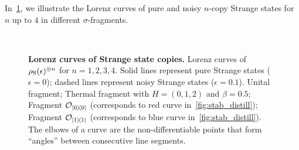 \documentclass[pra,
aps,
twocolumn,
superscriptaddress,
groupedaddress,
nofootinbib,
reprint
]{revtex4-1}
\begin{document}
In~\cref{fig:lcs}, we illustrate the Lorenz curves of pure and noisy $n$-copy Strange states for $n$ up to $4$ in different $\sigma$-fragments.
\begin{figure}%
    \centering
    \hspace{1pt}%
    \\
    \hspace{1pt}%
    \caption{\textbf{Lorenz curves of Strange state copies.} Lorenz curves of $\rho_{\rm{S}}(\epsilon)^{\otimes n}$ for $n=1,2,3,4$.
    Solid lines represent pure Strange states ($\epsilon = 0$); dashed lines represent noisy Strange states ($\epsilon = 0.1$).
     Unital fragment;  Thermal fragment with $H = (0,1,2)$ and $\beta = 0.5$;  Fragment $\mathcal{O}_{\ketbra{0}{0}}$ (corresponds to red curve in~\cref{fig:stab_distill});  Fragment $\mathcal{O}_{\ketbra{1}{1}}$ (corresponds to blue curve in~\cref{fig:stab_distill}).
    The elbows of a curve are the non-differentiable points that form ``angles'' between consecutive line segments.
    }%
    \label{fig:lcs}
\end{figure}
\end{document}
